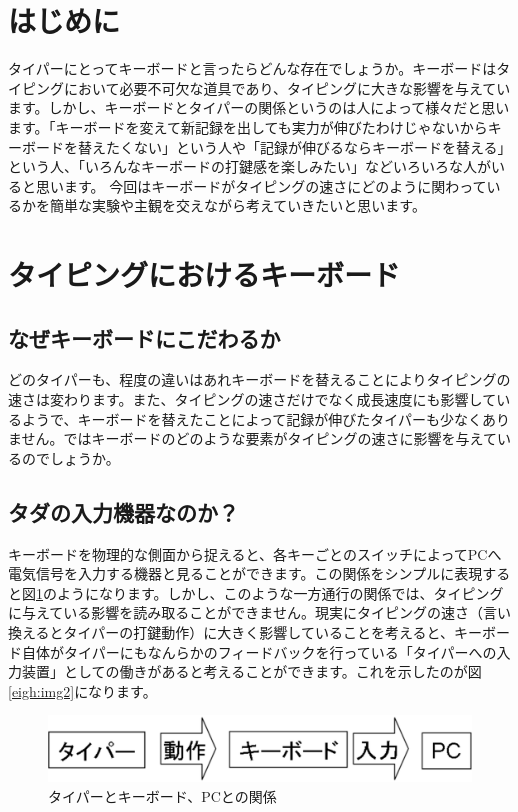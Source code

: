 
\section{はじめに}
タイパーにとってキーボードと言ったらどんな存在でしょうか。キーボードはタイピングにおいて必要不可欠な道具であり、タイピングに大きな影響を与えています。しかし、キーボードとタイパーの関係というのは人によって様々だと思います。「キーボードを変えて新記録を出しても実力が伸びたわけじゃないからキーボードを替えたくない」という人や「記録が伸びるならキーボードを替える」という人、「いろんなキーボードの打鍵感を楽しみたい」などいろいろな人がいると思います。 今回はキーボードがタイピングの速さにどのように関わっているかを簡単な実験や主観を交えながら考えていきたいと思います。

\section{タイピングにおけるキーボード}

\subsection{なぜキーボードにこだわるか}
どのタイパーも、程度の違いはあれキーボードを替えることによりタイピングの速さは変わります。また、タイピングの速さだけでなく成長速度にも影響しているようで、キーボードを替えたことによって記録が伸びたタイパーも少なくありません。ではキーボードのどのような要素がタイピングの速さに影響を与えているのでしょうか。

\subsection{タダの入力機器なのか？}
キーボードを物理的な側面から捉えると、各キーごとのスイッチによってPCへ電気信号を入力する機器と見ることができます。この関係をシンプルに表現すると図\ref{eigh:img1}のようになります。しかし、このような一方通行の関係では、タイピングに与えている影響を読み取ることができません。現実にタイピングの速さ（言い換えるとタイパーの打鍵動作）に大きく影響していることを考えると、キーボード自体がタイパーにもなんらかのフィードバックを行っている「タイパーへの入力装置」としての働きがあると考えることができます。これを示したのが図\ref{eigh:img2}になります。

\begin{figure}
 \begin{center}
   \includegraphics[width=14cm,clip]{res_eigh/img1.eps}
 \end{center}
 \caption{タイパーとキーボード、PCとの関係}
 \label{eigh:img1}
\end{figure}

